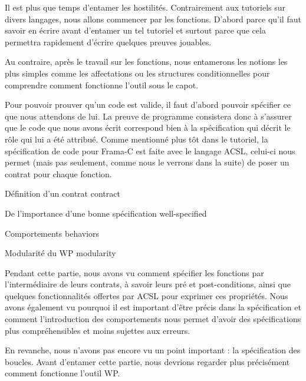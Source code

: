 
Il est plus que temps d'entamer les hostilités. Contrairement aux tutoriels 
sur divers langages, nous allons commencer par les fonctions. D'abord parce 
qu'il faut savoir en écrire avant d'entamer un tel tutoriel et surtout 
parce que cela permettra rapidement d'écrire quelques preuves jouables.



Au contraire, après le travail sur les fonctions, nous entamerons les notions 
les plus simples comme les affectations ou les structures conditionnelles pour 
comprendre comment fonctionne l'outil sous le capot.



Pour pouvoir prouver qu'un code est valide, il faut d'abord pouvoir spécifier 
ce que nous attendons de lui. La preuve de programme consistera donc à s'assurer 
que le code que nous avons écrit correspond bien à la spécification qui décrit
le rôle qui lui a été attribué. Comme mentionné plus tôt dans le tutoriel, la 
spécification de code pour Frama-C est faite avec le langage ACSL, celui-ci 
nous permet (mais pas seulement, comme nous le verrons dans la suite) de poser
un contrat pour chaque fonction.



\begin{levelTwo}
  {Définition d'un contrat}
  {contract}
\end{levelTwo}

\begin{levelTwo}
  {De l'importance d'une bonne spécification}
  {well-specified}
\end{levelTwo}

\begin{levelTwo}
  {Comportements}
  {behaviors}
\end{levelTwo}

\begin{levelTwo}
  {Modularité du WP}
  {modularity}
\end{levelTwo}

\horizontalLine
\newpage


Pendant cette partie, nous avons vu comment spécifier les fonctions par 
l'intermédiaire de leurs contrats, à savoir leurs pré et post-conditions, ainsi
que quelques fonctionnalités offertes par ACSL pour exprimer ces propriétés. 
Nous avons également vu pourquoi il est important d'être précis dans la 
spécification et comment l'introduction des comportements nous permet d'avoir
des spécifications plus compréhensibles et moins sujettes aux erreurs.



En revanche, nous n'avons pas encore vu un point important : la spécification 
des boucles. Avant d'entamer cette partie, nous devrions regarder plus 
précisément comment fonctionne l'outil WP.
